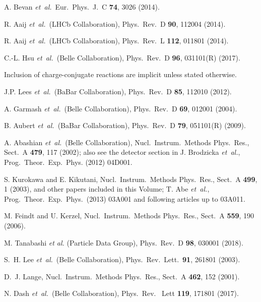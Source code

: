 \documentclass[aps,prl,preprint,tightenlines,superscriptaddress,,amsmath,byrevtex]{revtex4}
\def\etal  {{\it et~al.}}
\begin{document}
\begin{thebibliography}{99}

A. Bevan \etal\ Eur.\ Phys.\ J.\ C {\bf 74}, 3026 (2014).

  R. Aaij \etal\ (LHCb Collaboration),
  Phys.\ Rev.\ D {\bf 90}, 112004 (2014).
  
  R. Aaij \etal\ (LHCb Collaboration),
  Phys.\ Rev.\ L {\bf 112}, 011801 (2014).

  C.-L. Hsu \etal\ (Belle Collaboration),
  Phys.\ Rev.\ D {\bf 96}, 031101(R) (2017).
  
   
Inclusion of charge-conjugate reactions are implicit unless stated otherwise.


  J.P. Lees \etal\ (BaBar Collaboration),
  Phys.\ Rev.\ D {\bf 85}, 112010 (2012).
  

  A. Garmash \etal\ (Belle Collaboration),
  Phys.\ Rev.\ D {\bf 69}, 012001 (2004).
   
  
 B. Aubert \etal\ (BaBar Collaboration),
  Phys.\ Rev.\ D {\bf 79}, 051101(R) (2009).

   
  A. Abashian \etal\ (Belle Collaboration),
  Nucl.\ Instrum.\ Methods Phys.\ Res., Sect.\ A {\bf 479}, 117 (2002);
  also see the detector section in J. Brodzicka \etal,
  Prog.\ Theor.\ Exp.\ Phys. (2012) 04D001. 
 

  S. Kurokawa and E. Kikutani,
  Nucl.\ Instrum.\ Methods Phys.\ Res., Sect.\ A {\bf 499}, 1 (2003),
  and other papers included in this Volume;
  T. Abe \etal, Prog.\ Theor.\ Exp.\ Phys.\ (2013) 03A001 and
  following articles up to 03A011.

  M. Feindt and U. Kerzel,
  Nucl.\ Instrum.\ Methods Phys.\ Res., Sect.\ A {\bf 559}, 190 (2006).

  M. Tanabashi {\it et al.} (Particle Data Group), Phys.\ Rev.\ D {\bf 98}, 030001 (2018).

  S.~H. Lee \etal\ (Belle Collaboration),
  Phys.\ Rev.\ Lett.\  {\bf 91}, 261801 (2003).

  D.~J. Lange,
  Nucl.\ Instrum.\ Methods Phys.\ Res., Sect.\ A {\bf 462}, 152 (2001).


  N. Dash \etal\ (Belle Collaboration),
  Phys.\ Rev. \ Lett {\bf 119}, 171801 (2017).



\end{thebibliography}
\end{document}
